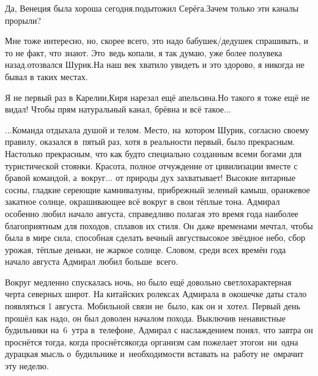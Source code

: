 \diagdash Да, Венеция была хороша сегодня.\mdash подытожил Серёга.\mdash Зачем только эти каналы прорыли?

\diagdash Мне тоже интересно, но, скорее всего, это надо бабушек/дедушек спрашивать, и то не факт, что знают. Это~ведь копали, я так думаю, уже более полувека назад.\mdash отозвался Шурик.\mdash На наш век хватило увидеть и это здорово, я никогда не бывал в таких местах.

\diagdash Я не первый раз в Карелии,\mdash Киря нарезал ещё апельсина.\mdash Но такого я тоже ещё не видал! Чтобы прям натуральный канал, брёвна и всё такое$\ldots$

$\ldots$Команда отдыхала душой и телом. Место, на~котором Шурик, согласно своему правилу, оказался в~пятый раз, хотя в реальности первый, было прекрасным. Настолько прекрасным, что как будто специально созданным всеми богами для туристической стоянки. Красота, полное отчуждение от цивилизации вместе с бравой командой, а~вокруг$\ldots$ от природы дух захватывает! Высокие янтарные сосны, гладкие сереющие камни\sdash валуны, прибрежный зеленый камыш, оранжевое закатное солнце, окрашивающее всё вокруг в свои тёплые тона. Адмирал особенно любил начало августа, справедливо полагая это время года наиболее благоприятным для походов, сплавов их стиля. Он даже временами мечтал, чтобы была в мире сила, способная сделать вечный август\mdash высокое звёздное небо, сбор урожая, тёплые деньки, не жаркое солнце. Словом, среди всех времён года начало августа Адмирал любил больше~всего.

Вокруг медленно спускалась ночь, но было ещё довольно светло\mdash характерная черта северных широт. На китайских ролексах Адмирала в окошечке даты стало появляться 1 августа. Мобильной связи не~было, как он и~хотел. Первый день прошёл как надо, он был доволен началом похода. Выключив ненавистные будильники на~6~утра в~телефоне, Адмирал с наслаждением понял, что завтра он проснётся тогда, когда проснётся\mdash когда организм сам пожелает этого\mdash и~ни~одна дурацкая мысль о~будильнике и~необходимости вставать на~работу не~омрачит эту неделю. 

\begin{center}
\end{center}
